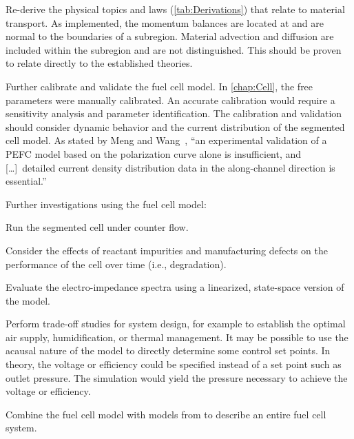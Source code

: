\begin{itemize*}
  \item Re-derive the physical topics and laws (\autoref{tab:Derivations}) that relate to material transport.  As implemented, the momentum balances are located at and are normal to the boundaries of a subregion.  Material advection and diffusion are included within the subregion and are not distinguished.  This should be proven to relate directly to the established theories.

  \item Further calibrate and validate the fuel cell model.  In \autoref{chap:Cell}, the free parameters were manually calibrated.  An accurate calibration would require a sensitivity analysis and parameter identification.  The calibration and validation should consider dynamic behavior and the current distribution of the segmented cell model.  As stated by Meng and Wang~\cite{Meng2004}, ``an experimental validation of a PEFC model based on the polarization curve alone is insufficient, and [\ldots]\ detailed current density distribution data in the along-channel direction is essential.''

  \item Further investigations using the fuel cell model:
  \begin{itemize*}
    \item Run the segmented cell under counter flow.

    \item Consider the effects of reactant impurities and manufacturing defects on the performance of the cell over time (i.e., degradation).

    \item Evaluate the electro-impedance spectra using a linearized, state-space version of the model.

    \item Perform trade-off studies for system design, for example to establish the optimal air supply, humidification, or thermal management.  It may be possible to use the acausal nature of the model to directly determine some control set points.  In theory, the voltage or efficiency could be specified instead of a set point such as outlet pressure.  The simulation would yield the pressure necessary to achieve the voltage or efficiency.
  \end{itemize*}
   
  \item Combine the fuel cell model with models from  to describe an entire fuel cell system.


\end{itemize*}
